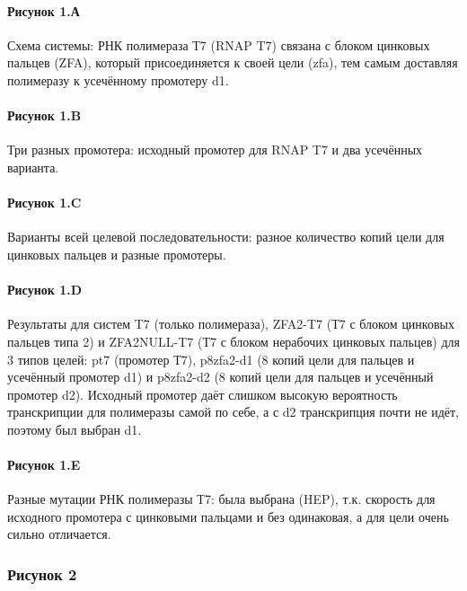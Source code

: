 \paragraph{Рисунок 1.А}

Схема системы: РНК полимераза Т7 (RNAP T7) связана с блоком цинковых пальцев (ZFA), который присоединяется к своей цели (zfa), тем самым доставляя полимеразу к усечённому промотеру d1.

\paragraph{Рисунок 1.B}

Три разных промотера: исходный промотер для RNAP T7 и два усечённых варианта.

\paragraph{Рисунок 1.C}

Варианты всей целевой последовательности: разное количество копий цели для цинковых пальцев и разные промотеры.

\paragraph{Рисунок 1.D}

Результаты для систем T7 (только полимераза), ZFA2-T7 (Т7 с блоком цинковых пальцев типа 2) и ZFA2NULL-T7 (Т7 с блоком нерабочих цинковых пальцев) для 3 типов целей: pt7 (промотер Т7), p8zfa2-d1 (8 копий цели для пальцев и усечённый промотер d1) и p8zfa2-d2 (8 копий цели для пальцев и усечённый промотер d2). Исходный промотер даёт слишком высокую вероятность транскрипции для полимеразы самой по себе, а с d2 транскрипция почти не идёт, поэтому был выбран d1.

\paragraph{Рисунок 1.E}

Разные мутации РНК полимеразы Т7: была выбрана (HEP), т.к. скорость для исходного промотера с цинковыми пальцами и без одинаковая, а для цели очень сильно отличается.

\subsubsection{Рисунок 2}

